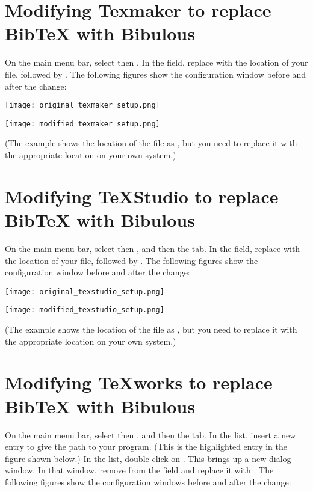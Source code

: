 \documentclass[letterpaper,10pt,english]{sphinxmanual}
\begin{document}
\section{Modifying Texmaker to replace BibTeX with Bibulous}
\label{getting_started:modifying-texmaker-to-replace-bibtex-with-bibulous}
On the main menu bar, select  then . In the  field, replace  with the location of your  file, followed by . The following figures show the configuration window before and after the change:

\texttt{[image: original\_texmaker\_setup.png]}

\texttt{[image: modified\_texmaker\_setup.png]}

(The example shows the location of the  file as , but you need to replace it with the appropriate location on your own system.)


\section{Modifying TeXStudio to replace BibTeX with Bibulous}
\label{getting_started:modifying-texstudio-to-replace-bibtex-with-bibulous}
On the main menu bar, select  then , and then the  tab. In the  field, replace  with the location of your  file, followed by . The following figures show the configuration window before and after the change:

\texttt{[image: original\_texstudio\_setup.png]}

\texttt{[image: modified\_texstudio\_setup.png]}

(The example shows the location of the  file as , but you need to replace it with the appropriate location on your own system.)


\section{Modifying TeXworks to replace BibTeX with Bibulous}
\label{getting_started:modifying-texworks-to-replace-bibtex-with-bibulous}
On the main menu bar, select  then , and then the  tab. In the  list, insert a new entry to give the path to your  program. (This is the highlighted entry in the figure shown below.) In the  list, double-click on . This brings up a new dialog window. In that window, remove  from the  field and replace it with . The following figures show the configuration windows before and after the change:
\end{document}
